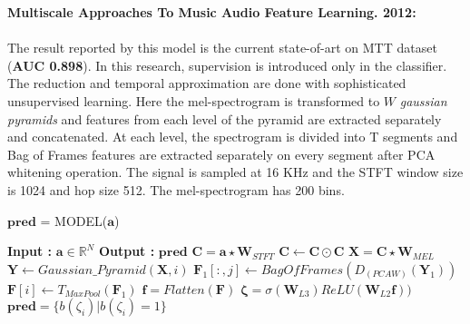 \noindent \textbf{Multiscale Approaches To Music Audio Feature Learning. 2012\cite{MultiScale}:}\\
\\
\noindent The result reported by this model is the current state-of-art on MTT dataset (\textbf{AUC 0.898}). In this research, supervision is introduced only in the classifier. The reduction and temporal approximation are done with sophisticated unsupervised learning. Here the mel-spectrogram is transformed to $W$ \textit{gaussian pyramids} and features from each level of the pyramid are extracted separately and concatenated. At each level, the spectrogram is divided into T segments and Bag of Frames features are extracted separately on every segment after PCA whitening operation. The signal is sampled at 16 KHz and the STFT window size is 1024 and hop size 512. The mel-spectrogram has 200 bins. 
\begin{algorithm}
  \caption{$\textbf{pred}$ = MODEL($\textbf{a}$) }\label{multiscale}
  \begin{algorithmic}[1]
    \Statex \textbf{Input :} $\textbf{a} \in \mathbb{R}^{N}$
    \Statex \textbf{Output :} $\textbf{pred}$  
    \State $\textbf{C} = \textbf{a} \star \textbf{W}_{STFT}$ 
    \State $\textbf{C} \leftarrow \textbf{C} \odot \textbf{C}$ 
    \State $\textbf{X} = \textbf{C} \star \textbf{W}_{MEL}$ 
     \State $\textbf{Y} \leftarrow Gaussian\_Pyramid(\textbf{X},i)$ 
       \State $\textbf{F}_{1}[:,j] \leftarrow BagOfFrames(D_{(PCAW)}(\textbf{Y}_{1}))$ 
      \EndFor
    \State $\textbf{F}[i] \leftarrow T_{MaxPool}(\textbf{F}_{1})$ 
    \EndFor
    \State $\textbf{f} = Flatten(\textbf{F})$ 
    \State $\bm{\zeta} = \sigma(\textbf{W}_{L3})ReLU(\textbf{W}_{L2}\textbf{f}))$ 
    \State $\textbf{pred} = \{ b(\zeta_{i}) | b(\zeta_{i}) = 1 \}$ 
  \end{algorithmic}
\end{algorithm}
\FloatBarrier

